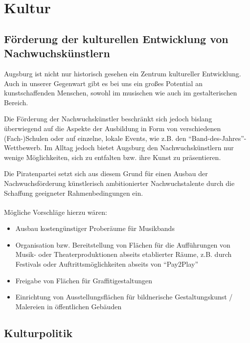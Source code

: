 \chapter{Kultur}
  
  \section{Förderung der kulturellen Entwicklung von Nachwuchskünstlern}
  Augsburg ist nicht nur historisch gesehen ein Zentrum kultureller 
  Entwicklung. Auch in unserer Gegenwart gibt es bei uns ein großes Potential 
  an kunstschaffenden Menschen, sowohl im musischen wie auch im 
  gestalterischen Bereich.
  
  Die Förderung der Nachwuchskünstler beschränkt sich jedoch bislang 
  überwiegend auf die Aspekte der Ausbildung in Form von verschiedenen 
  (Fach-)Schulen oder auf einzelne, lokale Events, wie z.B. den 
  "`Band-des-Jahres"'-Wettbewerb. Im Alltag jedoch bietet Augsburg den 
  Nachwuchskünstlern nur wenige Möglichkeiten, sich zu entfalten bzw. ihre 
  Kunst zu präsentieren.
  
  Die Piratenpartei setzt sich aus diesem Grund für einen Ausbau der 
  Nachwuchsförderung künstlerisch ambitionierter Nachwuchstalente durch die 
  Schaffung geeigneter Rahmenbedingungen ein.\\
  \\
  Mögliche Vorschläge hierzu wären:
  
  \begin{itemize}
    \item Ausbau kostengünstiger Proberäume für Musikbands
    \item Organisation bzw. Bereitstellung von Flächen für die Aufführungen
          von Musik- oder Theaterproduktionen abseits etablierter Räume, z.B. 
          durch Festivals oder Auftrittsmöglichkeiten abseits von "`Pay2Play"'
    \item Freigabe von Flächen für Graffitigestaltungen
    \item Einrichtung von Ausstellungsflächen für bildnerische 
          Gestaltungskunst / Malereien in öffentlichen Gebäuden 
  \end{itemize}
  
  \section{Kulturpolitik}
